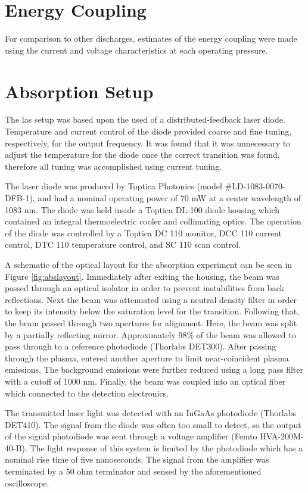 \section{Energy Coupling}
For comparison to other discharges, estimates of the energy coupling
were made using the current and voltage characteristics at each
operating pressure.

\section{Absorption Setup}
The \acs{las} setup was based upon the used of a distributed-feedback
laser diode. Temperature and current control of the diode provided
coarse and fine tuning, respectively, for the output frequency. It was
found that it was unnecessary to adjust the temperature for the diode
once the correct transition was found, therefore all tuning was
accomplished using current tuning.

The laser diode was produced by Toptica Photonics (model
\#LD-1083-0070-DFB-1), and had a nominal operating power of 70 mW at a
center wavelength of 1083 nm. The diode was held inside a Toptica DL-100
diode housing which contained an integral thermoelectric cooler and
collimating optics. The operation of the diode was controlled by a
Toptica DC 110 monitor, DCC 110 current control, DTC 110 temperature
control, and SC 110 scan control.

A schematic of the optical layout for the absorption experiment can be
seen in Figure \ref{fig:abslayout}. Immediately after exiting the
housing, the beam was passed through an optical isolator in order to
prevent instabilities from back reflections. Next the beam was
attenuated using a neutral density filter in order to keep its intensity
below the saturation level for the transition. Following that, the beam
passed through two apertures for alignment. Here, the beam was split by
a partially reflecting mirror. Approximately 98\% of the beam was
allowed to pass through to a reference photodiode (Thorlabs DET300).
After passing through the plasma, entered another aperture to limit
near-coincident plasma emissions. The background emissions were further
reduced using a long pass filter with a cutoff of 1000 nm. Finally, the
beam was coupled into an optical fiber which connected to the detection
electronics.

The transmitted laser light was detected with an InGaAs photodiode
(Thorlabs DET410). The signal from the diode was often too small to
detect, so the output of the signal photodiode was sent through a
voltage amplifier (Femto HVA-200M-40-B). The light response of this
system is limited by the photodiode which has a nominal rise time of
five nanoseconds. The signal from the amplifier was terminated by a 50
ohm terminator and sensed by the aforementioned oscilloscope.

